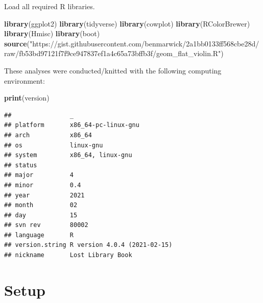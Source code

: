 \documentclass[]{book}
\newenvironment{Shaded}{\begin{snugshade}}{\end{snugshade}}
\newcommand{\KeywordTok}[1]{\textcolor[rgb]{0.13,0.29,0.53}{\textbf{#1}}}
\newcommand{\NormalTok}[1]{#1}
\newcommand{\StringTok}[1]{\textcolor[rgb]{0.31,0.60,0.02}{#1}}
\begin{document}
Load all required R libraries.

\begin{Shaded}
\begin{Highlighting}[]
\KeywordTok{library}\NormalTok{(ggplot2)}
\KeywordTok{library}\NormalTok{(tidyverse)}
\KeywordTok{library}\NormalTok{(cowplot)}
\KeywordTok{library}\NormalTok{(RColorBrewer)}
\KeywordTok{library}\NormalTok{(Hmisc)}
\KeywordTok{library}\NormalTok{(boot)}
\KeywordTok{source}\NormalTok{(}\StringTok{"https://gist.githubusercontent.com/benmarwick/2a1bb0133ff568cbe28d/raw/fb53bd97121f7f9ce947837ef1a4c65a73bffb3f/geom_flat_violin.R"}\NormalTok{)}
\end{Highlighting}
\end{Shaded}

These analyses were conducted/knitted with the following computing environment:

\begin{Shaded}
\begin{Highlighting}[]
\KeywordTok{print}\NormalTok{(version)}
\end{Highlighting}
\end{Shaded}

\begin{verbatim}
##                _                           
## platform       x86_64-pc-linux-gnu         
## arch           x86_64                      
## os             linux-gnu                   
## system         x86_64, linux-gnu           
## status                                     
## major          4                           
## minor          0.4                         
## year           2021                        
## month          02                          
## day            15                          
## svn rev        80002                       
## language       R                           
## version.string R version 4.0.4 (2021-02-15)
## nickname       Lost Library Book
\end{verbatim}

\hypertarget{setup-5}{%
\section{Setup}\label{setup-5}}
\end{document}

